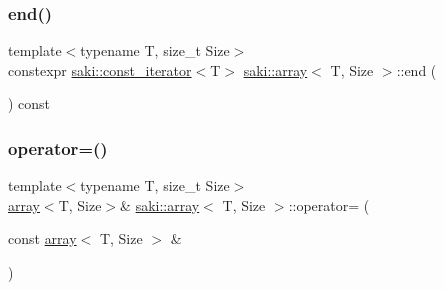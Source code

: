 \mbox{\label{classsaki_1_1array_a6d8e268a8e973e7fed55e0c3b4939e4e}} 
\subsubsection{\texorpdfstring{end()}{end()}\hspace{0.1cm}{\footnotesize\ttfamily [2/2]}}
{\footnotesize\ttfamily template$<$typename T, size\+\_\+t Size$>$ \\
constexpr \mbox{\hyperlink{classsaki_1_1const__iterator}{saki\+::const\+\_\+iterator}}$<$T$>$ \mbox{\hyperlink{classsaki_1_1array}{saki\+::array}}$<$ T, Size $>$\+::end (\begin{DoxyParamCaption}{ }\end{DoxyParamCaption}) const\hspace{0.3cm}{\ttfamily [inline]}}

\mbox{\label{classsaki_1_1array_aceb21e707471ccfc269c26138673e6ba}} 
\subsubsection{\texorpdfstring{operator=()}{operator=()}\hspace{0.1cm}{\footnotesize\ttfamily [1/2]}}
{\footnotesize\ttfamily template$<$typename T, size\+\_\+t Size$>$ \\
\mbox{\hyperlink{classsaki_1_1array}{array}}$<$T, Size$>$\& \mbox{\hyperlink{classsaki_1_1array}{saki\+::array}}$<$ T, Size $>$\+::operator= (\begin{DoxyParamCaption}\item[{const \mbox{\hyperlink{classsaki_1_1array}{array}}$<$ T, Size $>$ \&}]{ }\end{DoxyParamCaption})\hspace{0.3cm}{\ttfamily [default]}}

\mbox{\label{classsaki_1_1array_a437960c16333970285d7a66e34ca6923}} 
